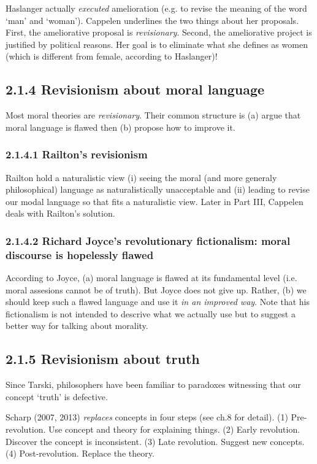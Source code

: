 \documentclass[
10pt, %
a4paper, %
twocolumn, %
landscape %
]{article}
\begin{document}
Haslanger actually \emph{executed} amelioration (e.g. to revise the meaning of the word `man' and `woman').
Cappelen underlines the two things about her proposals.
First, the ameliorative proposal is \emph{revisionary}. Second, the ameliorative project is justified by political reasons. Her goal is to eliminate what she defines as women (which is different from female, according to Haslanger)!


\subsection*{2.1.4 Revisionism about moral language}
Most moral theories are \emph{revisionary}.
Their common structure is (a) argue that moral language is flawed then (b) propose how to improve it.

\subsubsection*{2.1.4.1 Railton's revisionism}
Railton hold a naturalistic view (i) seeing the moral (and more generaly philosophical) language as naturalistically unacceptable and (ii) leading to revise our modal language so that fits a naturalistic view.
Later in Part III, Cappelen deals with Railton's solution.

\subsubsection*{2.1.4.2 Richard Joyce's revolutionary fictionalism: moral discourse is hopelessly flawed}
According to Joyce, (a) moral language is flawed at its fundamental level (i.e. moral assesions cannot be of truth). But Joyce does not give up. Rather, (b) we should keep such a flawed language and use it \emph{in an improved way}.
Note that his fictionalism is not intended to descrive what we actually use but to suggest a better way for talking about morality.

\subsection*{2.1.5 Revisionism about truth}
Since Tarski, philosophers have been familiar to paradoxes witnessing that our concept `truth' is defective.

Scharp (2007, 2013) \emph{replaces} concepts in four steps (see ch.8 for detail).
  (1) Pre-revolution. Use concept and theory for explaining things.
  (2) Early revolution. Discover the concept is inconsistent.
  (3) Late revolution. Suggest new concepts.
  (4) Post-revolution. Replace the theory.
\end{document}
